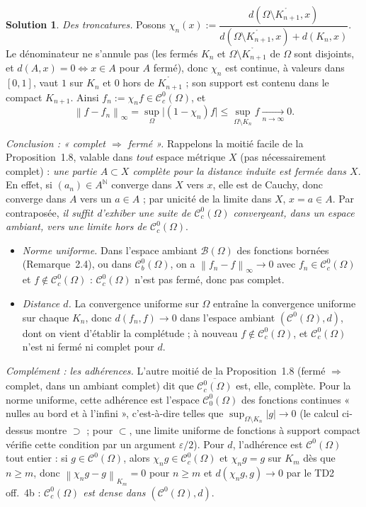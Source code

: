 \documentclass[11pt,a4paper]{article}
\newcommand{\N}{\mathbb{N}}
\newcommand{\interieur}[1]{\mathring{#1}}
\newcommand{\adh}[1]{\overline{#1}}
\newcommand{\norm}[1]{\left\|#1\right\|}
\newcommand{\Cz}{\mathcal{C}^0}
\newcommand{\Cc}{\mathcal{C}^0_c}
\newcommand{\ie}{c'est-à-dire}
\theoremstyle{definition}
\newtheorem*{solution}{Solution}
\begin{document}
\begin{solution}
\emph{Des troncatures.} Posons $\chi_n(x):=\dfrac{d(\Omega\setminus\interieur{K_{n+1}},x)}{d(\Omega\setminus\interieur{K_{n+1}},x)+d(K_n,x)}$. Le dénominateur ne s'annule pas (les fermés $K_n$ et $\Omega\setminus\interieur{K_{n+1}}$ de $\Omega$ sont disjoints, et $d(A,x)=0\iff x\in A$ pour $A$ fermé), donc $\chi_n$ est continue, à valeurs dans $[0,1]$, vaut $1$ sur $K_n$ et $0$ hors de $\interieur{K_{n+1}}$ ; son support est contenu dans le compact $K_{n+1}$. Ainsi $f_n:=\chi_nf\in\Cc(\Omega)$, et
\[
\norm{f-f_n}_\infty=\sup_{\Omega}\big|(1-\chi_n)f\big|\le\sup_{\Omega\setminus K_n}f\xrightarrow[n\to\infty]{}0 .
\]

\emph{Conclusion : « complet $\Rightarrow$ fermé ».} Rappelons la moitié facile de la Proposition~1.8, valable dans \emph{tout} espace métrique $X$ (pas nécessairement complet) : \emph{une partie $A\subset X$ complète pour la distance induite est fermée dans $X$}. En effet, si $(a_n)\in A^\N$ converge dans $X$ vers $x$, elle est de Cauchy, donc converge dans $A$ vers un $a\in A$ ; par unicité de la limite dans $X$, $x=a\in A$. Par contraposée, \emph{il suffit d'exhiber une suite de $\Cc(\Omega)$ convergeant, dans un espace ambiant, vers une limite hors de $\Cc(\Omega)$}.

\begin{itemize}
  \item \emph{Norme uniforme.} Dans l'espace ambiant $\mathcal B(\Omega)$ des fonctions bornées (Remarque~2.4), ou dans $\Cz_b(\Omega)$, on a $\norm{f_n-f}_\infty\to0$ avec $f_n\in\Cc(\Omega)$ et $f\notin\Cc(\Omega)$ : $\Cc(\Omega)$ n'est pas fermé, donc pas complet.
  \item \emph{Distance $d$.} La convergence uniforme sur $\Omega$ entraîne la convergence uniforme sur chaque $K_n$, donc $d(f_n,f)\to0$ dans l'espace ambiant $(\Cz(\Omega),d)$, dont on vient d'établir la complétude ; à nouveau $f\notin\Cc(\Omega)$, et $\Cc(\Omega)$ n'est ni fermé ni complet pour $d$.
\end{itemize}

\emph{Complément : les adhérences.} L'autre moitié de la Proposition~1.8 (fermé $\Rightarrow$ complet, dans un ambiant complet) dit que $\adh{\Cc(\Omega)}$ est, elle, complète. Pour la norme uniforme, cette adhérence est l'espace $\Cz_0(\Omega)$ des fonctions continues « nulles au bord et à l'infini », \ie{} telles que $\sup_{\Omega\setminus K_n}|g|\to0$ (le calcul ci-dessus montre $\supset$ ; pour $\subset$, une limite uniforme de fonctions à support compact vérifie cette condition par un argument $\varepsilon/2$). Pour $d$, l'adhérence est $\Cz(\Omega)$ tout entier : si $g\in\Cz(\Omega)$, alors $\chi_ng\in\Cc(\Omega)$ et $\chi_ng=g$ sur $K_m$ dès que $n\ge m$, donc $\norm{\chi_ng-g}_{K_m}=0$ pour $n\ge m$ et $d(\chi_ng,g)\to0$ par le TD2 off.~4b : \emph{$\Cc(\Omega)$ est dense dans $(\Cz(\Omega),d)$}.
\end{solution}
\end{document}
